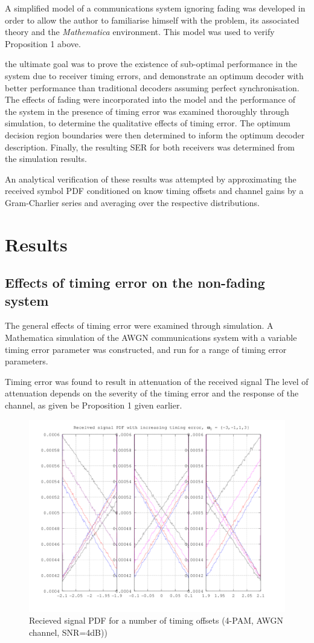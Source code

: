 A simplified model of a communications system ignoring fading was developed in order to allow the author to familiarise himself with the problem, its associated theory and the \emph{Mathematica} environment. This model was used to verify Proposition 1 above.

the ultimate goal was to prove the existence of sub-optimal performance in the system due to receiver timing errors, and demonstrate an optimum decoder with better performance than traditional decoders assuming perfect synchronisation. The effects of fading were incorporated into the model and the performance of the system in the presence of timing error was examined thoroughly through simulation, to determine the qualitative effects of timing error. The optimum decision region boundaries were then determined to inform the optimum decoder description. Finally, the resulting SER for both receivers was determined from the simulation results.

An analytical verification of these results was attempted by approximating the received symbol PDF conditioned on know timing offsets and channel gains by a Gram-Charlier series and averaging over the respective distributions.

\chapter{Results}

\section{Effects of timing error on the non-fading system}

The general effects of timing error were examined through simulation. A Mathematica simulation of the AWGN communications system with a variable timing error parameter was constructed, and run for a range of timing error parameters.

Timing error was found to result in attenuation of the received signal The level of attenuation depends on the severity of the timing error and the response of the channel, as given be Proposition 1 given earlier.

\begin{figure}[htbp]
\centering
\includegraphics[width=0.8\linewidth]{../../../plots/4pamdecisionerror.png}
\caption[Non-fading received symbol PDF]{Recieved signal PDF for a number of timing offsets (4-PAM, AWGN channel, SNR=4dB))}
\end{figure}

